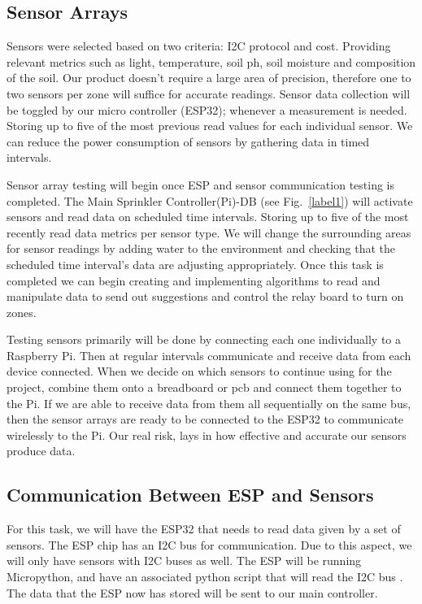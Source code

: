 \documentclass[letterpaper, 10 pt, conference]{ieeeconf}  %
\begin{document}
\subsection{Sensor Arrays}
Sensors were selected based on two criteria: I2C protocol and cost. Providing relevant metrics such as light, temperature, soil ph, soil moisture and composition of the soil. Our product doesn't require a large area of precision, therefore one to two sensors per zone will suffice for accurate readings. Sensor data collection will be toggled by our micro controller (ESP32); whenever a measurement is needed. Storing up to five of the most previous read values for each individual sensor. We can reduce the power consumption of sensors by gathering data in timed intervals.

Sensor array testing will begin once ESP and sensor communication testing is completed. The Main Sprinkler Controller(Pi)-DB (see Fig.~\ref{label1}) will activate sensors and read data on scheduled time intervals. Storing up to five of the most recently read data metrics per sensor type. We will change the surrounding areas for sensor readings by adding water to the environment and checking that the scheduled time interval's data are adjusting appropriately. Once this task is completed we can begin creating and implementing algorithms to read and manipulate data to send out suggestions and control the relay board to turn on zones.

Testing sensors primarily will be done by connecting each one individually to a Raspberry Pi. Then at regular intervals communicate and receive data from each device connected. When we decide on which sensors to continue using for the project, combine them onto a breadboard or pcb and connect them together to the Pi. If we are able to receive data from them all sequentially on the same bus, then the sensor arrays are ready to be connected to the ESP32 to communicate wirelessly to the Pi. Our real risk, lays in how effective and accurate our sensors produce data.

\subsection{Communication Between ESP and Sensors}
For this task, we will have the ESP32 that needs to read data given by a set of sensors. The ESP chip has an I2C bus for communication. Due to this aspect, we will only have sensors with I2C buses as well. The ESP will be running Micropython, and have an associated python script that will read the I2C bus \cite{LowCostBLE}. The data that the ESP now has stored will be sent to our main controller.
\end{document}
